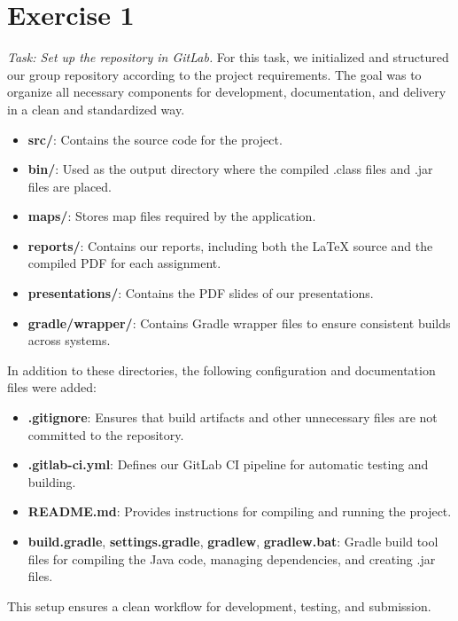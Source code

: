 \section*{Exercise 1}
\textit{Task: Set up the repository in GitLab.} 
\newline\newline
For this task, we initialized and structured our group repository according to the project requirements. The goal was to organize all necessary components for development, documentation, and delivery in a clean and standardized way.
\begin{itemize}
    \item \textbf{src/}: Contains the source code for the project.
    \item \textbf{bin/}: Used as the output directory where the compiled .class files and .jar files are placed.
    \item \textbf{maps/}: Stores map files required by the application.
    \item \textbf{reports/}: Contains our reports, including both the LaTeX source and the compiled PDF for each assignment.
    \item \textbf{presentations/}: Contains the PDF slides of our presentations.
    \item \textbf{gradle/wrapper/}: Contains Gradle wrapper files to ensure consistent builds across systems.
\end{itemize}

\noindent In addition to these directories, the following configuration and documentation files were added:
\begin{itemize}
    \item \textbf{.gitignore}: Ensures that build artifacts and other unnecessary files are not committed to the repository.
    \item \textbf{.gitlab-ci.yml}: Defines our GitLab CI pipeline for automatic testing and building.
    \item \textbf{README.md}: Provides instructions for compiling and running the project.
    \item \textbf{build.gradle}, \textbf{settings.gradle}, \textbf{gradlew}, \textbf{gradlew.bat}: Gradle build tool files for compiling the Java code, managing dependencies, and creating .jar files.
\end{itemize}

\noindent
This setup ensures a clean workflow for development, testing, and submission.
